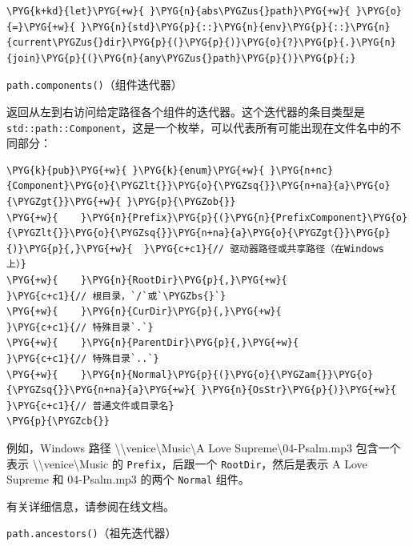 \begin{Verbatim}[commandchars=\\\{\},breaklines=true,breakanywhere=true,fontsize=\codefont,xleftmargin=17bp]
\PYG{k+kd}{let}\PYG{+w}{ }\PYG{n}{abs\PYGZus{}path}\PYG{+w}{ }\PYG{o}{=}\PYG{+w}{ }\PYG{n}{std}\PYG{p}{::}\PYG{n}{env}\PYG{p}{::}\PYG{n}{current\PYGZus{}dir}\PYG{p}{(}\PYG{p}{)}\PYG{o}{?}\PYG{p}{.}\PYG{n}{join}\PYG{p}{(}\PYG{n}{any\PYGZus{}path}\PYG{p}{)}\PYG{p}{;}
\end{Verbatim}

\begin{mySidenote}
\texttt{path.components()}（组件迭代器）
\end{mySidenote}

返回从左到右访问给定路径各个组件的迭代器。这个迭代器的条目类型是 \texttt{std::path::Component}，这是一个枚举，可以代表所有可能出现在文件名中的不同部分：

\begin{Verbatim}[commandchars=\\\{\},breaklines=true,breakanywhere=true,fontsize=\codefont,xleftmargin=17bp]
\PYG{k}{pub}\PYG{+w}{ }\PYG{k}{enum}\PYG{+w}{ }\PYG{n+nc}{Component}\PYG{o}{\PYGZlt{}}\PYG{o}{\PYGZsq{}}\PYG{n+na}{a}\PYG{o}{\PYGZgt{}}\PYG{+w}{ }\PYG{p}{\PYGZob{}}
\PYG{+w}{    }\PYG{n}{Prefix}\PYG{p}{(}\PYG{n}{PrefixComponent}\PYG{o}{\PYGZlt{}}\PYG{o}{\PYGZsq{}}\PYG{n+na}{a}\PYG{o}{\PYGZgt{}}\PYG{p}{)}\PYG{p}{,}\PYG{+w}{  }\PYG{c+c1}{// 驱动器路径或共享路径（在Windows 上）}
\PYG{+w}{    }\PYG{n}{RootDir}\PYG{p}{,}\PYG{+w}{                      }\PYG{c+c1}{// 根目录，`/`或`\PYGZbs{}`}
\PYG{+w}{    }\PYG{n}{CurDir}\PYG{p}{,}\PYG{+w}{                       }\PYG{c+c1}{// 特殊目录`.`}
\PYG{+w}{    }\PYG{n}{ParentDir}\PYG{p}{,}\PYG{+w}{                    }\PYG{c+c1}{// 特殊目录`..`}
\PYG{+w}{    }\PYG{n}{Normal}\PYG{p}{(}\PYG{o}{\PYGZam{}}\PYG{o}{\PYGZsq{}}\PYG{n+na}{a}\PYG{+w}{ }\PYG{n}{OsStr}\PYG{p}{)}\PYG{+w}{             }\PYG{c+c1}{// 普通文件或目录名}
\PYG{p}{\PYGZcb{}}
\end{Verbatim}

例如，Windows 路径 \textbackslash{}\textbackslash{}venice\textbackslash{}Music\textbackslash{}A Love Supreme\textbackslash{}04-Psalm.mp3 包含一个表示 \textbackslash{}\textbackslash{}venice\textbackslash{}Music 的 \texttt{Prefix}，后跟一个 \texttt{RootDir}，然后是表示 A Love Supreme 和 04-Psalm.mp3 的两个 \texttt{Normal} 组件。

有关详细信息，请参阅在线文档。

\begin{mySidenote}
\texttt{path.ancestors()}（祖先迭代器）
\end{mySidenote}

